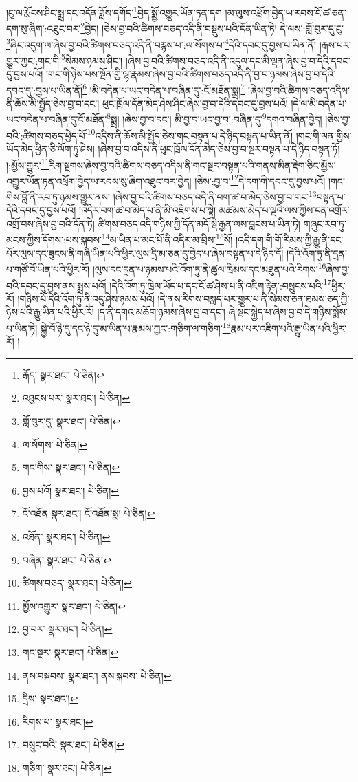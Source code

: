 །ངུ་ལ་རྨོངས་ཤིང་སྨྲ་དང་འདོན་ཟློས་དགོད་\footnote{རྒོད་  སྣར་ཐང་།  པེ་ཅིན། }བྱེད་སྨྱོ་འགྱུར་ཡོན་ཏན་དག །མ་ལུས་འཕྲོག་བྱེད་ཡ་རབས་ངོ་ཚ་ཅན་དག་སུ་ཞིག་:འཐུང་བར་\footnote{འཐུངས་པར་  སྣར་ཐང་།  པེ་ཅིན། }བྱེད། །ཅེས་བྱ་བའི་ཚིགས་བཅད་འདི་ནི་བསྡུས་པའི་དོན་ཡིན་ཏེ། དེ་ལས་:གློ་བུར་དུ་ངུ་\footnote{གློ་བུར་དུ་  སྣར་ཐང་།  པེ་ཅིན། }ཞིང་འདུག་ལ་ཞེས་བྱ་བའི་ཚིགས་བཅད་འདི་ནི་བརྙས་པ་:ལ་སོགས་པ་\footnote{ལ་སོགས་  པེ་ཅིན། }དེའི་དབང་དུ་བྱས་པ་ཡིན་ནོ། །རྒས་པར་གྱུར་ཀྱང་:གང་གི་\footnote{གང་གིས་  སྣར་ཐང་།  པེ་ཅིན། }སེམས་ཉམས་ཤིང་། །ཞེས་བྱ་བའི་ཚིགས་བཅད་འདི་ནི་འདུལ་དང་མི་ལྡན་ཞེས་བྱ་བ་དེའི་དབང་དུ་བྱས་པའོ། །གང་གི་ཉེས་པས་སྔོན་གྱི་ལྷ་རྣམས་ཞེས་བྱ་བའི་ཚིགས་བཅད་འདི་ནི་བྱ་བ་ཉམས་ཞེས་བྱ་བ་དེའི་དབང་དུ་:བྱས་པ་ཡིན་ནོ།\footnote{བྱས་པའོ།  སྣར་ཐང་།  པེ་ཅིན། } །མི་བདེན་པ་ཡང་བདེན་པ་བཞིན་དུ་:ངོ་མཐོན་སྨྲ།\footnote{ངོ་འཐོན  སྣར་ཐང་། ངོ་འཐོན་སྨ།  པེ་ཅིན། } །ཞེས་བྱ་བའི་ཚིགས་བཅད་འདིས་ནི་ཆོས་མི་སྤྱོད་ཅེས་བྱ་བ་དང་། ཕུང་ཁྲོལ་དོན་མེད་ཤེས་ཤིང་ཞེས་བྱ་བ་དེའི་དབང་དུ་བྱས་པའོ། །དེ་ལ་མི་བདེན་པ་ཡང་བདེན་པ་བཞིན་དུ་ངོ་མཐོན་\footnote{འཐོན་  སྣར་ཐང་།  པེ་ཅིན། }སྨྲ། །ཞེས་བྱ་བ་དང་། མི་བྱ་བ་ཡང་བྱ་བ་:བཞིན་དུ་\footnote{བཞིན་  སྣར་ཐང་།  པེ་ཅིན། }དགའ་བཞིན་བྱེད། །ཅེས་བྱ་བའི་:ཚིགས་བཅད་ཕྱེད་པོ་\footnote{ཚིགས་བཅད་  སྣར་ཐང་།  པེ་ཅིན། }འདིས་ནི་ཆོས་མི་སྤྱོད་ཅེས་གང་བསྟན་པ་དེ་ཉིད་བསྟན་པ་ཡིན་ནོ། །གང་གི་ལན་གྱིས་ཡོད་མེད་ཕྱིན་ཅི་ལོག་ཏུ་ཤེས། །ཞེས་བྱ་བ་འདིས་ནི་ཕུང་ཁྲོལ་དོན་མེད་ཅེས་བྱ་བ་སྔར་བསྟན་པ་དེ་ཉིད་བསྟན་ཏོ། །:མྱོས་གྱུར་\footnote{མྱོས་འགྱུར་  སྣར་ཐང་།  པེ་ཅིན། }རིག་སྔགས་ཞེས་བྱ་བའི་ཚིགས་བཅད་འདིས་ནི་གང་སྔར་བསྟན་པའི་གནས་མིན་རྡེག་ཅིང་མྱོས་འགྱུར་ཡོན་ཏན་འཕྲོག་བྱེད་ཡ་རབས་སུ་ཞིག་འཐུང་བར་བྱེད། །ཅེས་:བྱ་བ་\footnote{བྱ་བར་  སྣར་ཐང་།  པེ་ཅིན། }དེ་དག་གི་དབང་དུ་བྱས་པའོ། །གང་གིས་བློ་ནི་རབ་ཏུ་ཉམས་གྱུར་ནས། །ཞེས་བྱ་བའི་ཚིགས་བཅད་འདི་ནི་བག་ཚ་བ་མེད་ཅེས་བྱ་བ་གང་\footnote{གང་སྔར་  སྣར་ཐང་།  པེ་ཅིན། }བསྟན་པ་དེའི་དབང་དུ་བྱས་པའོ། །འདིར་བག་ཚ་བ་མེད་པ་ནི་མི་འཇིགས་པ་སྟེ། མཚམས་མེད་པ་ལྔའི་ལས་ཀྱིས་ངན་འགྲོར་འགྲོ་བས་ཞེས་བྱ་བའི་དོན་ཏེ། ཚིགས་བཅད་འདི་གཉིས་ཀྱི་དོན་མདོ་སྡེ་རྒྱན་ལས་བླངས་པ་ཡིན་ཏེ། གཞུང་རབ་ཏུ་མངས་ཀྱིས་དོགས་:པས་སྐབས་\footnote{ནས་བསྐབས་  སྣར་ཐང་། ནས་སྐབས་  པེ་ཅིན། }མ་ཡིན་པ་མང་པོ་ནི་འདིར་མ་བྲིས་\footnote{དྲིས་  སྣར་ཐང་། }སོ། །འདི་དག་གི་གོ་རིམས་ཀྱི་རྒྱུ་ནི་དང་པོར་ལུས་དང་ཟུངས་ནི་གཞི་ཡིན་པའི་ཕྱིར་ལུས་དྲི་མ་ཅན་དུ་བྱེད་པ་ཞེས་བསྟན་པ་དེ་ཉིད་དོ། །དེའི་འོག་ཏུ་ནི་དྲན་པ་གཙོ་བོ་ཡིན་པའི་ཕྱིར་རོ། །ལུས་དང་དྲན་པ་ཉམས་པའི་འོག་ཏུ་ནི་ཚུལ་ཁྲིམས་དང་མཐུན་པའི་རིགས་\footnote{རིགས་པ་  སྣར་ཐང་། }ཞེས་བྱ་བའི་དབང་དུ་བྱས་ནས་སྨྲས་པའོ། །དེའི་འོག་ཏུ་ཁྲེལ་ཡོད་པ་དང་ངོ་ཚ་ཤེས་པ་ནི་འཇིག་རྟེན་:བསྲུངས་པའི་\footnote{བསྲུང་བའི་  སྣར་ཐང་།  པེ་ཅིན། }ཕྱིར་རོ། །གཉིས་པོ་དེའི་འོག་ཏུ་ནི་འདུ་ཤེས་ཉམས་པའོ། །དེ་ནས་རིགས་བསླད་པར་གྱུར་པ་ནི་སེམས་ཅན་ཐམས་ཅད་ཀྱི་ཉེས་པའི་རྒྱུ་ཡིན་པའི་ཕྱིར་རོ། །ད་ནི་དགའ་མཆོག་ཉམས་ཞེས་བྱ་བ་དང་། ཞེ་སྡང་སྐྱེད་པ་ཞེས་བྱ་བ་དེ་གཉིས་སྨོས་པ་ཡིན་ཏེ། སྐྱེ་བོ་ཉེ་དུ་དང་ཉེ་དུ་མ་ཡིན་པ་རྣམས་ཀྱང་:གཅིག་ལ་གཅིག་\footnote{གཅིག་  སྣར་ཐང་།  པེ་ཅིན། }རྣམ་པར་འཇིག་པའི་རྒྱུ་ཡིན་པའི་ཕྱིར་རོ། །

